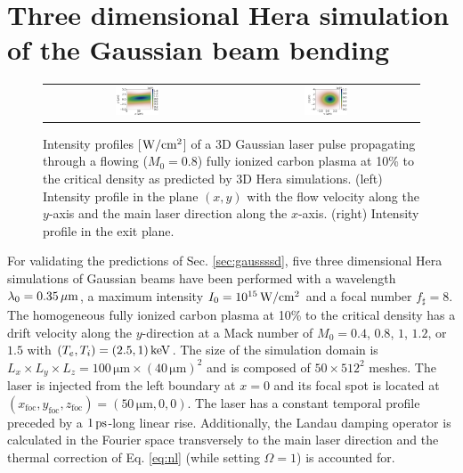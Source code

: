 \documentclass[%
 reprint,
 amsmath,amssymb,
 aps,
]{revtex4-1}
\begin{document}
\section{Three dimensional Hera simulation of the Gaussian beam bending}
\label{sec:hera3d}
\begin{figure}
\begin{tabular}{cc}
\includegraphics[width=0.24\textwidth]{I3D_bb_z_M08.png} &\includegraphics[width=0.24\textwidth]{I3D_bb_x_mod.png}
\end{tabular}
\caption{ \label{fig:hera3d} 
Intensity profiles [$\rm W/cm^2$] of a 3D Gaussian laser pulse propagating through a flowing ($M_0=0.8$) fully ionized carbon plasma at 10\% to the critical density  as predicted by 3D  Hera simulations.
(left) Intensity profile in the  plane $(x,y)$ with the flow velocity along the $y$-axis and the main laser direction along the $x$-axis. (right)  Intensity profile in the exit plane. 
}
\end{figure}
For validating the predictions of Sec. \ref{sec:gaussssd},
five three dimensional Hera simulations of Gaussian beams  have been performed with a wavelength $\lambda_0=0.35\,\rm\mu m$, a maximum intensity $I_0=10^{15}\, \rm  W/cm^2$ and a focal number $f_\sharp = 8$. 
The homogeneous fully ionized carbon plasma at 10\% to the critical density has a drift velocity along the $y$-direction at a Mack number of $M_0 = 0.4$, $0.8$, $1$, $1.2$, or $1.5$ with $(T_e, T_i) =(2.5 ,1) \, \rm keV$. The size of the simulation domain is $L_x\times L_y \times L_z = 100 \, \mathrm{\mu m} \times ( 40 \, \mathrm{\mu m} )^2$ and is composed of  $50\times512^2$ meshes. The laser is injected from the left boundary at $x=0$  and its focal spot is located at $(x_\mathrm{foc},y_\mathrm{foc},z_\mathrm{foc}) = (50\,\mathrm{\mu m}, 0, 0)$. 
The laser has a constant temporal profile preceded by a $1\, \rm ps$-long linear rise. 
Additionally, the Landau damping operator is calculated in the Fourier space transversely to the main laser direction  \cite[]{Berger_98,POP_Rose_96,Masson_2006} and the thermal correction of Eq. \eqref{eq:nl} (while setting $\Omega=1$) is accounted for. 
\end{document}
